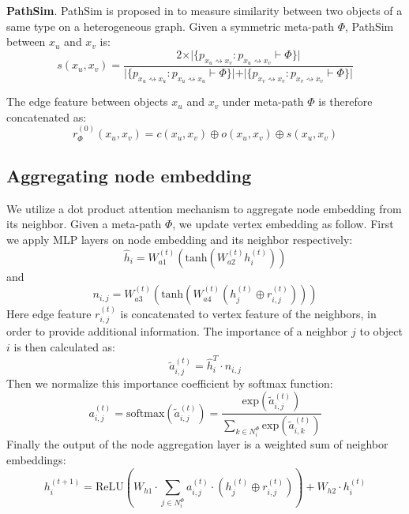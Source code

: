 \noindent{\small$\bullet$}\textbf{PathSim}. 
PathSim is proposed in \citep{SunHYYW11} to measure similarity between two objects of a same type on a heterogeneous graph. Given a symmetric meta-path $\Phi$, PathSim between $x_u$ and $x_v$ is:
\begin{equation*}
s(x_u,x_v) = \frac{2\times\vert\{ p_{x_u \rightsquigarrow x_v}:p_{x_u \rightsquigarrow x_v} \vdash \Phi \}\vert}{\vert\{ p_{x_u \rightsquigarrow x_u}:p_{x_u \rightsquigarrow x_u} \vdash \Phi \}\vert +\vert\{ p_{x_v \rightsquigarrow x_v}:p_{x_v \rightsquigarrow x_v} \vdash \Phi \}\vert }
\end{equation*}

The edge feature between objects $x_u$ and $x_v$ under meta-path $\Phi$ is therefore concatenated as:
\begin{equation}
\label{eq:edge}
r^{(0)}_\Phi(x_u,x_v) = c(x_u,x_v)\oplus o(x_u,x_v)\oplus s(x_u,x_v)
\end{equation}

\subsection{Aggregating node embedding}

We utilize a dot product attention mechanism to aggregate node embedding from its neighbor. Given a meta-path $\Phi$, we update vertex embedding as follow. First we apply MLP layers on node embedding and its neighbor respectively:
\begin{equation}
\hat{h}_i= W_{a1}^{(t)}(\text{tanh}(W_{a2}^{(t)}h^{(t)}_i ))
\end{equation}
and
\begin{equation}
n_{i,j} = W_{a3}^{(t)}(\text{tanh}(W_{a4}^{(t)}(h^{(t)}_j \oplus r^{(t)}_{i,j}) ))
\end{equation}
Here edge feature $r^{(t)}_{i,j}$ is concatenated to vertex feature of the neighbors, in order to provide additional information. The importance of a neighbor $j$ to object $i$ is then calculated as:
\begin{equation}
\label{eq:dot}
\tilde{a}^{(t)}_{i,j} = \hat{h}_i^T \cdot n_{i,j}
\end{equation}
Then we normalize this importance coefficient by softmax function:
\begin{equation}
\label{eq:softmax}
a^{(t)}_{i,j} = \text{softmax}(\tilde{a}^{(t)}_{i,j}) = \dfrac{\text{exp}(\tilde{a}^{(t)}_{i,j})}{\sum_{k\in N^\Phi_i}\text{exp}(\tilde{a}^{(t)}_{i,k})}
\end{equation}
Finally the output of the node aggregation layer is a weighted sum of neighbor embeddings: 
\begin{equation}
\label{eq:upd_node}
h^{(t+1)}_i = \text{ReLU}( W_{h1}\cdot \sum_{j\in N^\Phi_i} a^{(t)}_{i,j} \cdot ( h^{(t)}_j \oplus r^{(t)}_{i,j} ) ) + W_{h2}\cdot h^{(t)}_i
\end{equation} 


